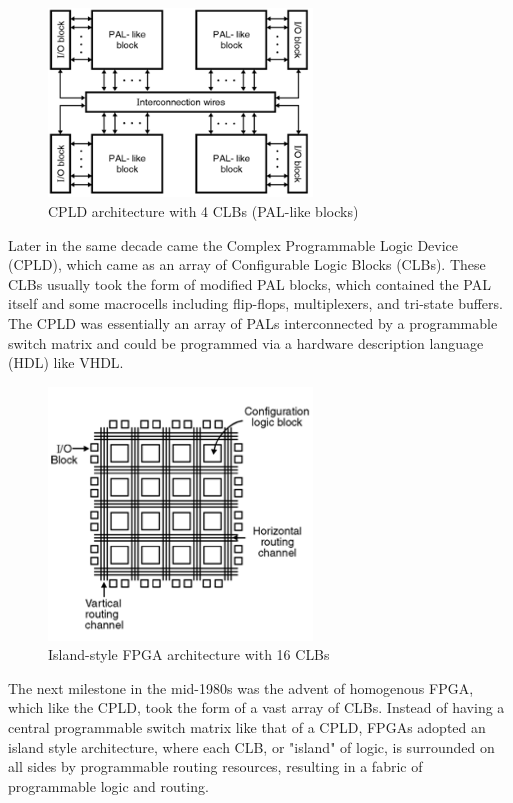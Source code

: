 \documentclass[twocolumn]{article}
\begin{document}
    \begin{figure}
        \centering
        \includegraphics[width=7.0cm]{figures/cpld.png}
        \caption{CPLD architecture with 4 CLBs (PAL-like blocks)}
        \label{fig:cpld}
    \end{figure}

    Later in the same decade came the Complex Programmable Logic Device (CPLD), which came as an array of Configurable Logic Blocks (CLBs).
    These CLBs usually took the form of modified PAL blocks, which contained the PAL itself and some macrocells including flip-flops, multiplexers, and tri-state buffers.
    The CPLD was essentially an array of PALs interconnected by a programmable switch matrix and could be programmed via a hardware description language (HDL) like VHDL.

    \begin{figure}
        \centering
        \includegraphics[width=7.0cm]{figures/fpga.png}
        \caption{Island-style FPGA architecture with 16 CLBs}
        \label{fig:fpga}
    \end{figure}

    The next milestone in the mid-1980s was the advent of homogenous FPGA, which like the CPLD, took the form of a vast array of CLBs. 
    Instead of having a central programmable switch matrix like that of a CPLD, FPGAs adopted an island style architecture, where each CLB, or "island" of logic, is surrounded on all sides by programmable routing resources, resulting in a fabric of programmable logic and routing. 
\end{document}
